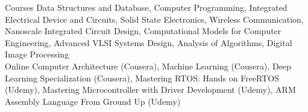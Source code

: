 
\begin{cvskills}

    \cvskill
        {Courses} %
        {Data Structures and Database, Computer Programming, Integrated Electrical Device and Circuits,
        Solid State Electronics, Wireless Communication, 
        Nanoscale Integrated Circuit Design, Computational Models for Computer Engineering,
        Advanced VLSI Systems Design, Analysis of Algorithms, Digital Image Processing}
    \\
    \cvskill
        {Online} %
        {Computer Architecture (Cousera), 
        Machine Learning (Cousera), Deep Learning Specialization (Cousera), 
        Mastering RTOS: Hands on FreeRTOS (Udemy), 
        Mastering Microcontroller with Driver Development (Udemy),
        ARM Assembly Language From Ground Up (Udemy)}
        
    
    
    \end{cvskills}